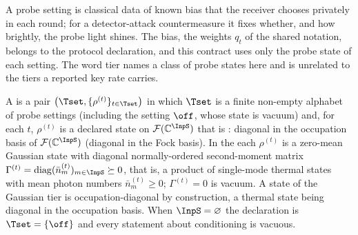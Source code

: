 
A probe setting is classical data of known bias that the receiver chooses
privately in each round; for a detector-attack countermeasure it fixes
whether, and how brightly, the probe light shines. The bias, the weights $q_t$ of the shared
notation, belongs to the protocol declaration, and this contract uses only the
probe state of each setting. The word tier names a class of probe states here
and is unrelated to the tiers a reported key rate carries.

\begin{definition}\label{def:probe}
A  is a pair $\big(\Tset,\{\rho^{(t)}\}_{t\in\Tset}\big)$
in which $\Tset$ is a finite non-empty alphabet of probe settings (including
the setting $\off$, whose state is vacuum) and, for each $t$, $\rho^{(t)}$ is a
declared state on $\mathcal{F}(\mathbb{C}^{\InpS})$ that is
: diagonal in the occupation basis of
$\mathcal{F}(\mathbb{C}^{\InpS})$ (diagonal in the Fock basis). In the
 each $\rho^{(t)}$ is a zero-mean Gaussian state with
diagonal normally-ordered second-moment matrix
$\Gamma^{(t)}=\operatorname{diag}(\bar n^{(t)}_m)_{m\in\InpS}\succeq0$, that is,
a product of single-mode thermal states with mean photon numbers
$\bar n^{(t)}_m\ge0$; $\Gamma^{(t)}=0$ is vacuum. A state of the Gaussian tier
is occupation-diagonal by construction, a thermal state being diagonal in the
occupation basis. When $\InpS=\varnothing$ the
declaration is $\Tset=\{\off\}$ and every statement about conditioning is
vacuous.
\end{definition}

